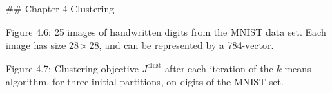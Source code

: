

## Chapter 4 Clustering

Figure 4.6: 25 images of handwritten digits from the MNIST data set. Each image has size \(28\times 28\), and can be represented by a 784-vector.

Figure 4.7: Clustering objective \(J^{\text{clust}}\) after each iteration of the \(k\)-means algorithm, for three initial partitions, on digits of the MNIST set.

